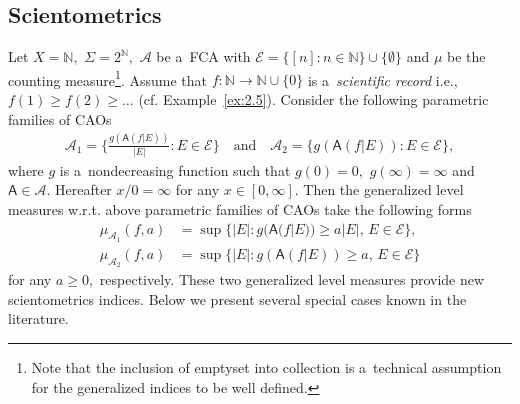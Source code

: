 \documentclass[preprint,11pt]{elsarticle}
\theoremstyle{definition}
\newcommand\mN{{\mathbb N}}
\newcommand\cE{{\mathcal E}}
\newcommand\sA{\mathsf{A}}
\newcommand\aA[2][E]{\sA(#2|#1)}%
\newcommand\aAi[3][E]{\sA^{#3}(#2|#1)}%
\newcommand\bA{\mathscr{A}}%
\newcommand\mub[1][\bA]{\mu_{#1}}
\renewcommand\ge{\geqslant}
\newcommand{\tx}{\textstyle{}}
\begin{document}
\subsection{\textbf{Scientometrics}}
Let $X=\mN,$ $\Sigma=2^\mN,$  $\bA$ be a~FCA with $\cE=\{[n]\colon n\in\mN\}\cup \{\emptyset\}$  and  $\mu$ be the counting measure\footnote{
Note that the inclusion of emptyset into collection is a~technical assumption for the generalized indices to be well defined.}.
Assume that $f\colon \mN\to \mN\cup\{0\}$ is a~\textit{scientific record} i.e., $f(1)\ge f(2)\ge \ldots$
(cf. Example~\ref{ex:2.5}).
Consider the following parametric families of CAOs
\begin{align*}
    \bA_{1}=\big\{\tx{\frac{g(\aA{f})}{|E|}}\colon E\in\cE\big\}\quad \text{and}\quad
    \bA_2=\{g(\aA{f})\colon E\in\cE\},
\end{align*}
where $g$ is a~nondecreasing function such that $g(0)=0,$  $g(\infty)=\infty$ and $\sA\in\bA.$
Hereafter $x/0=\infty$ for any $x\in [0,\infty].$
Then the generalized level measures w.r.t. above parametric families of CAOs take the following forms
     \begin{align}
        \mub[\bA_1](f,a)&=\sup\big\{|E|\colon g(\aA{f})\ge a|E|,\, E\in \cE\big\},\label{index:n1}\\
         \mub[\bA_2](f,a)&=\sup\big\{|E|\colon g(\aA{f})\ge a,\, E\in \cE\big\}\label{index:n2}
    \end{align}
for any $a\ge 0,$ respectively. These two generalized level measures provide new scientometrics indices.  Below we present several special cases known in the literature.
\end{document}
